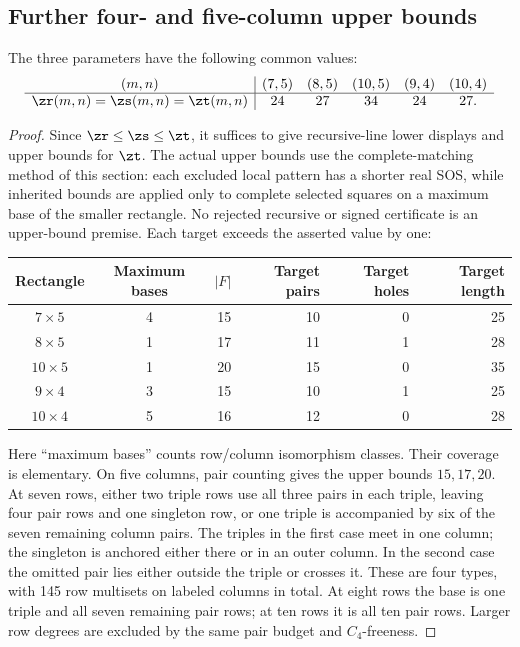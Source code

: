 \subsection{Further four- and five-column upper bounds}
\label{sec:further-finite}

\begin{theorem}\label{thm:further-finite}
The three parameters have the following common values:
\[
\begin{array}{c|ccccc}
(m,n)&(7,5)&(8,5)&(10,5)&(9,4)&(10,4)\\
\hline
\zr(m,n)=\zs(m,n)=\zt(m,n)&24&27&34&24&27.
\end{array}
\]
\end{theorem}

\begin{proof}
Since $\zr\le\zs\le\zt$, it suffices to give recursive-line lower
displays and upper bounds for $\zt$. The actual upper
bounds use the complete-matching method of this section: each excluded
local pattern has a shorter real SOS, while inherited bounds are applied
only to complete selected squares on a maximum base of the smaller
rectangle. No rejected recursive or signed certificate is an upper-bound
premise. Each target exceeds the asserted value by one:
\begin{center}
\begin{tabular}{ccrrrr}
\toprule
Rectangle&Maximum bases&$|F|$&Target pairs&Target holes&Target length\\
\midrule
$7\times5$&4&15&10&0&25\\
$8\times5$&1&17&11&1&28\\
$10\times5$&1&20&15&0&35\\
$9\times4$&3&15&10&1&25\\
$10\times4$&5&16&12&0&28\\
\bottomrule
\end{tabular}
\end{center}

Here ``maximum bases'' counts row/column isomorphism classes. Their
coverage is elementary. On five columns, pair counting gives the upper
bounds $15,17,20$. At seven rows, either two triple rows use all three
pairs in each triple, leaving four pair rows and one singleton row, or
one triple is accompanied by six of the seven remaining column pairs.
The triples in the first case meet in one column; the singleton is
anchored either there or in an outer column. In the second case the
omitted pair lies either outside the triple or crosses it. These are
four types, with 145 row multisets on labeled columns in total. At eight
rows the base is one triple and all seven remaining pair rows; at ten
rows it is all ten pair rows. Larger row degrees are excluded by the
same pair budget and $C_4$-freeness.


\end{proof}
